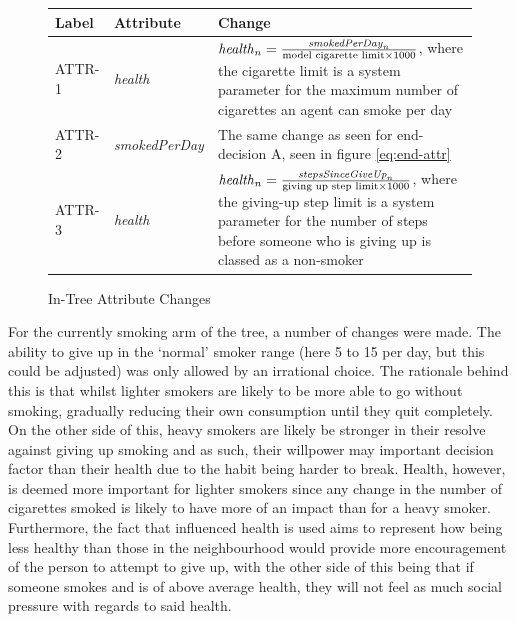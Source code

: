 \documentclass[]{report}
\begin{document}
\begin{figure}
\begin{center}
\label{tab:attr-change}
\begin{tabular}{|l||l|p{10cm}|}
\hline
\bf{Label} & \bf{Attribute} & \bf{Change}\\
\hline
ATTR-1 	& \emph{health} 				&	$\text{\emph{health}}_{n} = \frac{\text{\emph{smokedPerDay}}_{n}}{\text{model cigarette limit} \times 1000}$, where the cigarette limit is a system parameter for the maximum number of cigarettes an agent can smoke per day		\\
ATTR-2	&	\emph{smokedPerDay}  	&	The same change as seen for end-decision A, seen in figure \ref{eq:end-attr}				\\
ATTR-3	&	\emph{health}					&	$\text{\emph{health}}_{n} = \frac{\text{\emph{stepsSinceGiveUp}}_{n}}{\text{giving up step limit} \times 1000}$, where the giving-up step limit is a system parameter for the number of steps before someone who is giving up is classed as a non-smoker \\
\hline

\end{tabular}
\end{center}
\caption{In-Tree Attribute Changes}
\end{figure}
For the currently smoking arm of the tree, a number of changes were made. The ability to give up in the `normal' smoker range (here 5 to 15 per day, but this could be adjusted) was only allowed by an irrational choice. The rationale behind this is that whilst lighter smokers are likely to be more able to go without smoking\cite{NHS-43}, gradually reducing their own consumption until they quit completely. On the other side of this, heavy smokers are likely be stronger in their resolve against giving up smoking and as such, their willpower may important decision factor than their health due to the habit being harder to break. Health, however, is deemed more important for lighter smokers since any change in the number of cigarettes smoked is likely to have more of an impact than for a heavy smoker. Furthermore, the fact that influenced health is used aims to represent how being less healthy than those in the neighbourhood would provide more encouragement of the person to attempt to give up, with the other side of this being that if someone smokes and is of above average health, they will not feel as much social pressure with regards to said health.
\end{document}
